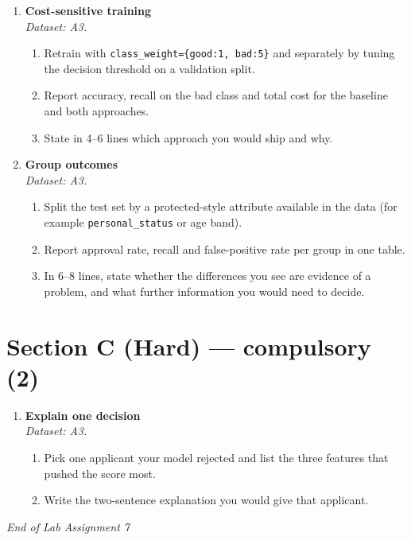 \documentclass[11pt,a4paper]{article}
\begin{document}
\begin{enumerate}[label=\textbf{B\arabic*.}, leftmargin=*]

  \item \textbf{Cost-sensitive training} \\
    \emph{Dataset: A3.}
    \begin{enumerate}[label=(\alph*), leftmargin=*]
      \item Retrain with \texttt{class\_weight=\{good:1, bad:5\}} and separately by tuning the decision threshold on a validation split.
      \item Report accuracy, recall on the bad class and total cost for the baseline and both approaches.
      \item State in 4--6 lines which approach you would ship and why.
    \end{enumerate}

  \item \textbf{Group outcomes} \\
    \emph{Dataset: A3.}
    \begin{enumerate}[label=(\alph*), leftmargin=*]
      \item Split the test set by a protected-style attribute available in the data (for example \texttt{personal\_status} or age band).
      \item Report approval rate, recall and false-positive rate per group in one table.
      \item In 6--8 lines, state whether the differences you see are evidence of a problem, and what further information you would need to decide.
    \end{enumerate}

\end{enumerate}

\section*{Section C (Hard) --- compulsory \quad (2)}

\begin{enumerate}[label=\textbf{C\arabic*.}, leftmargin=*]

  \item \textbf{Explain one decision} \\
    \emph{Dataset: A3.}
    \begin{enumerate}[label=(\alph*), leftmargin=*]
      \item Pick one applicant your model rejected and list the three features that pushed the score most.
      \item Write the two-sentence explanation you would give that applicant.
    \end{enumerate}

\end{enumerate}

\vfill\noindent\textit{End of Lab Assignment 7}

\notesources{\AMLLabSources}
\end{document}
